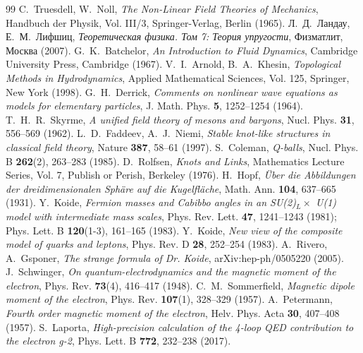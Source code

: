 \documentclass[11pt,a4paper]{article}
\theoremstyle{definition}
\theoremstyle{remark}
\begin{document}
\begin{thebibliography}{99}
C.~Truesdell, W.~Noll, \textit{The Non-Linear Field Theories of Mechanics}, Handbuch der Physik, Vol. III/3, Springer-Verlag, Berlin (1965).
Л.~Д.~Ландау, Е.~М.~Лифшиц, \textit{Теоретическая физика. Том 7: Теория упругости}, Физматлит, Москва (2007).
G.~K.~Batchelor, \textit{An Introduction to Fluid Dynamics}, Cambridge University Press, Cambridge (1967).
V.~I.~Arnold, B.~A.~Khesin, \textit{Topological Methods in Hydrodynamics}, Applied Mathematical Sciences, Vol. 125, Springer, New York (1998).
G.~H.~Derrick, \textit{Comments on nonlinear wave equations as models for elementary particles}, J. Math. Phys. \textbf{5}, 1252--1254 (1964).
T.~H.~R.~Skyrme, \textit{A unified field theory of mesons and baryons}, Nucl. Phys. \textbf{31}, 556--569 (1962).
L.~D.~Faddeev, A.~J.~Niemi, \textit{Stable knot-like structures in classical field theory}, Nature \textbf{387}, 58--61 (1997).
S.~Coleman, \textit{Q-balls}, Nucl. Phys. B \textbf{262}(2), 263--283 (1985).
D.~Rolfsen, \textit{Knots and Links}, Mathematics Lecture Series, Vol. 7, Publish or Perish, Berkeley (1976).
H.~Hopf, \textit{\"Uber die Abbildungen der dreidimensionalen Sph\"are auf die Kugelfl\"ache}, Math. Ann. \textbf{104}, 637--665 (1931).
Y.~Koide, \textit{Fermion masses and Cabibbo angles in an SU(2)$_L \times$ U(1) model with intermediate mass scales}, Phys. Rev. Lett. \textbf{47}, 1241--1243 (1981); Phys. Lett. B \textbf{120}(1-3), 161--165 (1983).
Y.~Koide, \textit{New view of the composite model of quarks and leptons}, Phys. Rev. D \textbf{28}, 252--254 (1983).
A.~Rivero, A.~Gsponer, \textit{The strange formula of Dr. Koide}, arXiv:hep-ph/0505220 (2005).
J.~Schwinger, \textit{On quantum-electrodynamics and the magnetic moment of the electron}, Phys. Rev. \textbf{73}(4), 416--417 (1948).
C.~M.~Sommerfield, \textit{Magnetic dipole moment of the electron}, Phys. Rev. \textbf{107}(1), 328--329 (1957).
A.~Petermann, \textit{Fourth order magnetic moment of the electron}, Helv. Phys. Acta \textbf{30}, 407--408 (1957).
S.~Laporta, \textit{High-precision calculation of the 4-loop QED contribution to the electron g-2}, Phys. Lett. B \textbf{772}, 232--238 (2017).

\end{thebibliography}
\end{document}
